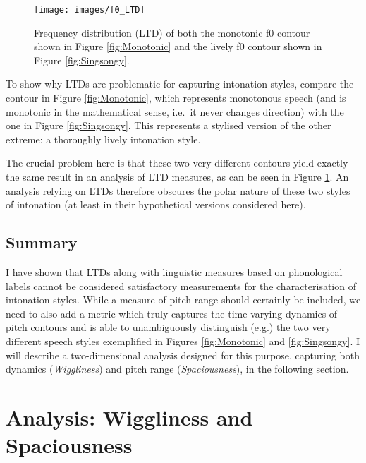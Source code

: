 \begin{figure}[p]
	
	{\texttt{[image: images/f0\_LTD]}
		
	}
	
	\caption{Frequency distribution (LTD) of both the monotonic f0 contour shown in Figure \ref{fig:Monotonic}
		and the lively f0 contour shown in Figure \ref{fig:Singsongy}.}\label{fig:LTD}
\end{figure}




To show why LTDs are problematic for capturing intonation styles, compare the contour in Figure \ref{fig:Monotonic}, which represents monotonous speech (and is monotonic in the mathematical sense, i.e.~it never changes direction) with the one in Figure \ref{fig:Singsongy}. This represents a stylised version of the other extreme: a thoroughly lively intonation style.




The crucial problem here is that these two very different contours yield exactly the same result in an analysis of LTD measures, as can be seen in Figure \ref{fig:LTD}. An analysis relying on LTDs therefore obscures the polar nature of these two styles of intonation (at least in their hypothetical versions considered here).






	\subsection{Summary}\label{sec:int_back_measures_summary}

I have shown that LTDs along with linguistic measures based on phonological labels cannot be considered satisfactory measurements for the characterisation of intonation styles. While a measure of pitch range should certainly be included, we need to also add a metric which truly captures the time-varying dynamics of pitch contours and is able to unambiguously distinguish (e.g.) the two very different speech styles exemplified in Figures \ref{fig:Monotonic} and \ref{fig:Singsongy}. I will describe a two-dimensional analysis designed for this purpose, capturing both dynamics (\textit{Wiggliness}) and pitch range (\textit{Spaciousness}), in the following section.


	\section{Analysis: Wiggliness and Spaciousness}\label{sec:intonation_analysis}

